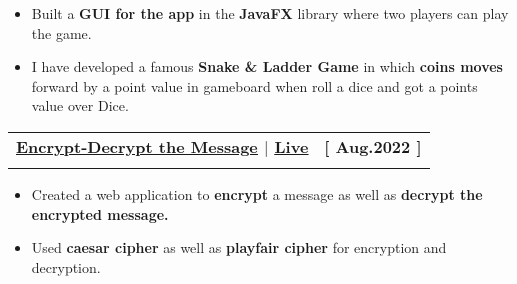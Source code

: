 \documentclass[letterpaper,11pt]{article}
\makeatletter
\newcommand{\resumeItem}[1]{
  \item\small{
    {#1 \vspace{-2pt}}
  }
}
\newcommand{\resumeSubheading}[4]{
  \vspace{-2pt}\item
    \begin{tabular*}{1.0\textwidth}[t]{l@{\extracolsep{\fill}}r}
      \textbf{\large#1} & \textbf{\small #2} \\
      \textit{\large#3} & \textit{\small #4} \\
      
    \end{tabular*}\vspace{-7pt}
}
\newcommand{\resumeItemListStart}{\begin{itemize}}
\newcommand{\resumeItemListEnd}{\end{itemize}\vspace{-5pt}}
\makeatother
\begin{document}
          \vspace{-8pt}
          \resumeItemListStart
             \resumeItem{\normalsize{Built a \textbf{GUI for the app} in the \textbf{JavaFX} library  where two players can play the game.}}
          
            \resumeItem{\normalsize{I have developed a famous \textbf{Snake \& Ladder Game} in which \textbf{coins moves} forward by a point value in gameboard when roll a dice and got a points value over Dice.}}
            
          \resumeItemListEnd 

    
        \resumeSubheading
            {\href{https://github.com/rohitkr01/Encryption-Decryption/}{\underline{\textbf{Encrypt-Decrypt the Message}}{\raisebox{-0.1\height}\faExternalLink }} $|$ 
            {\href{https://endeq.herokuapp.com/}{\underline{\textcolor{accent}{Live}} }} } {[ Aug.2022 ]} 
            {\vspace{1pt}{HTML, CSS, JavaScript}}{} 
    
            \vspace{-8pt}
        
          \resumeItemListStart
            \resumeItem{\normalsize{Created a web application to \textbf{encrypt} a message as well as \textbf{decrypt the encrypted message.}}}
            \resumeItem{\normalsize{Used \textbf{caesar cipher} as well as \textbf{playfair cipher} for encryption and decryption.}}
            
        \resumeItemListEnd
          
          \vspace{-13pt}
\end{document}
